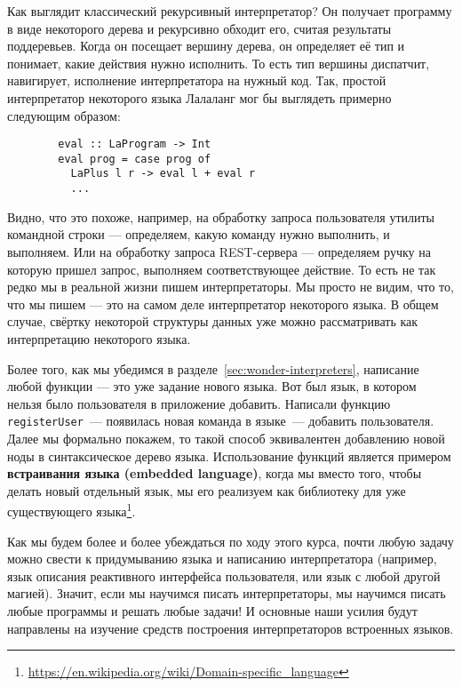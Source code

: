 \documentclass[12pt]{article}
\newcommand{\vocab}[1]{\textbf{#1}} %
\begin{document}
    Как выглядит классический рекурсивный интерпретатор?
    Он получает программу в виде некоторого дерева и рекурсивно обходит его, считая результаты поддеревьев.
    Когда он посещает вершину дерева, он определяет её тип и понимает, какие действия нужно исполнить.
    То есть тип вершины диспатчит, навигирует, исполнение интерпретатора на нужный код.
    Так, простой интерпретатор некоторого языка Лалаланг мог бы выглядеть примерно следующим образом:
    \begin{verbatim}
        eval :: LaProgram -> Int
        eval prog = case prog of
          LaPlus l r -> eval l + eval r
          ...
    \end{verbatim}

    Видно, что это похоже, например, на обработку запроса пользователя утилиты командной строки --- определяем, какую команду нужно выполнить, и выполняем.
    Или на обработку запроса REST-сервера --- определяем ручку на которую пришел запрос, выполняем соответствующее действие.
    То есть не так редко мы в реальной жизни пишем интерпретаторы.
    Мы просто не видим, что то, что мы пишем --- это на самом деле интерпретатор некоторого языка.
    В общем случае, свёртку некоторой структуры данных уже можно рассматривать как интерпретацию некоторого языка.

    Более того, как мы убедимся в разделе~\ref{sec:wonder-interpreters}, написание любой функции --- это уже задание нового языка.
    Вот был язык, в котором нельзя было пользователя в приложение добавить.
    Написали функцию \texttt{registerUser}~--- появилась новая команда в языке~--- добавить пользователя.
    Далее мы формально покажем, то такой способ эквивалентен добавлению новой ноды в синтаксическое дерево языка.
    Использование функций является примером \vocab{встраивания языка (embedded language)}, когда мы вместо того, чтобы делать новый отдельный язык, мы его реализуем как библиотеку для уже существующего языка\footnote{\url{https://en.wikipedia.org/wiki/Domain-specific_language}}.


    Как мы будем более и более убеждаться по ходу этого курса, почти любую задачу можно свести к придумыванию языка и написанию интерпретатора (например, язык описания реактивного интерфейса пользователя, или язык с любой другой магией).
    Значит, если мы научимся писать интерпретаторы, мы научимся писать любые программы и решать любые задачи!
    И основные наши усилия будут направлены на изучение средств построения интерпретаторов встроенных языков.
\end{document}
